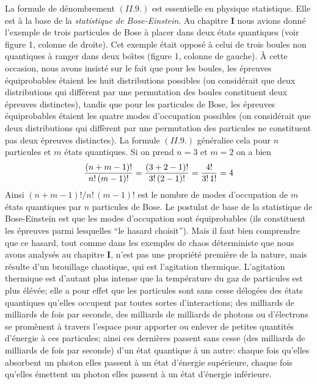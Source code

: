 \medskip 
La formule de d\'enombrement $(II.9.)$ est essentielle en physique 
statistique.  Elle est \`a la base de la {\it statistique de Bose-Einstein}. 
Au chapitre {\bf I} nous avions donn\'e l'exemple de trois particules de 
Bose \`a placer dans deux \'etats quantiques (voir figure 1,  colonne de 
droite).  Cet exemple \'etait oppos\'e \`a celui de trois boules non 
quantiques \`a ranger dans deux bo\^\i tes (figure 1,  colonne de 
gauche).  \`A cette occasion, nous avons insist\'e sur le fait que
pour les boules,  les \'epreuves \'equiprobables \'etaient les huit
distributions possibles (on consid\'erait que deux distributions qui
diff\`erent par une permutation des boules constituent deux \'epreuves
distinctes),  tandis que pour les particules de Bose,  les \'epreuves
\'equiprobables \'etaient les quatre modes d'occupation possibles
(on consid\'erait que deux distributions qui diff\`erent par une
permutation des particules ne constituent pas deux \'epreuves distinctes).  
\medskip 
La formule $(II.9.)$ g\'en\'eralise cela pour $n$ particules et $m$  
\'etats quantiques. Si on prend $n = 3$ et $m = 2$ on a bien 
$${(n+m-1)! \over n!\, (m-1)!} = {(3+2-1)! \over 3!\, (2-1)!} = {4! \over 
3!\, 1!} = 4$$ 
Ainsi ${(n+m-1)! \bigl/ n!\, (m-1)!}$ est le nombre de modes  
d'occupation de $m$ \'etats quantiques par $n$ particules de Bose. 
\medskip 
Le postulat de base de la statistique de Bose-Einstein est que les 
modes d'occupation sont \'equiprobables (ils constituent les \'epreuves 
parmi lesquelles ``le hasard choisit''). Mais il faut bien comprendre que 
ce hasard, tout comme dans les exemples de chaos d\'eterministe que 
nous avons analys\'es au chapitre {\bf I}, n'est pas une propri\'et\'e 
premi\`ere de la nature,  mais r\'esulte d'un brouillage chaotique, qui  
est l'agitation thermique.  L'agitation thermique est d'autant plus intense
que la temp\'erature du gaz de particules est plus \'el\'ev\'ee;  elle a
pour effet que les particules sont sans cesse d\'elog\'ees des \'etats
quantiques qu'elles occupent par toutes sortes d'interactions;  des milliards
de milliards de fois par seconde,  des milliards de milliards de photons ou 
d'\'electrons se prom\`enent \`a travers l'espace pour apporter ou enlever
de petites quantit\'es d'\'energie \`a ces particules;  ainsi ces derni\`eres
passent sans cesse (des milliards de milliards de fois par seconde) d'un
\'etat quantique \`a un autre:  chaque fois qu'elles absorbent un photon
elles passent \`a un \'etat d'\'energie sup\'erieure,  chaque fois qu'elles 
\'emettent un photon elles passent \`a un \'etat d'\'energie inf\'erieure. 
